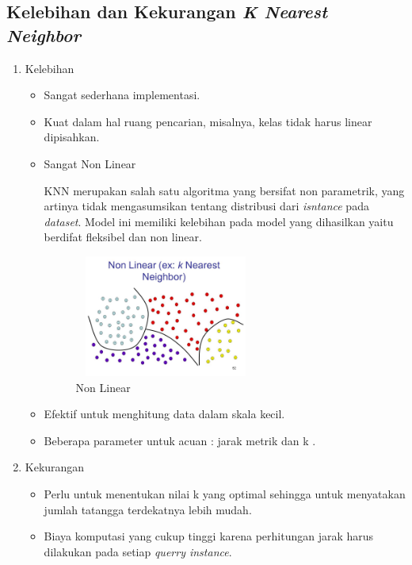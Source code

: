 \subsection{Kelebihan dan Kekurangan \textit{K Nearest Neighbor}}
\begin{enumerate}
    \item Kelebihan
\begin{itemize}
        \item Sangat sederhana implementasi.
        \item Kuat dalam hal ruang pencarian, misalnya, kelas tidak harus linear dipisahkan.
        \item Sangat Non Linear
        \par KNN merupakan salah satu algoritma yang bersifat non parametrik, yang artinya tidak mengasumsikan tentang distribusi dari \textit{isntance} pada \textit{dataset}. Model ini memiliki kelebihan pada model yang dihasilkan yaitu berdifat fleksibel dan non linear.
        \begin{figure}[!htpb]
        \centering
        \includegraphics[width=6cm, height=4cm]{figures/knn.jpg}
        \caption{Non Linear
        \label{eq:31}}
        \end{figure} 
        \item Efektif untuk menghitung data dalam skala kecil.
        \item Beberapa parameter untuk acuan : jarak metrik dan k \cite{lestari2015penerapan}.
\end{itemize}
\item Kekurangan
    \begin{itemize}
        \item Perlu untuk menentukan nilai k yang optimal sehingga untuk menyatakan jumlah
tatangga terdekatnya lebih mudah.
        \item  Biaya komputasi yang cukup tinggi karena perhitungan jarak harus dilakukan pada setiap \textit{querry instance}\cite{afandie2014implementasi}.
    \end{itemize}
\end{enumerate}
